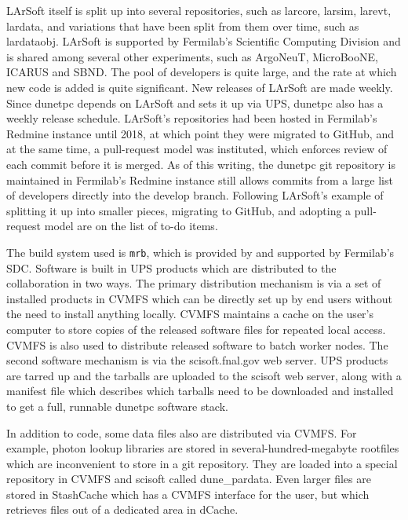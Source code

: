 LArSoft itself is split up into several repositories, such as larcore, larsim, larevt, lardata, and variations that have been split from them over time, such as lardataobj.  LArSoft is supported by Fermilab's Scientific Computing Division and is shared among several other experiments, such as ArgoNeuT, MicroBooNE, ICARUS and SBND.  The pool of developers is quite large, and the rate at which new code is added is quite significant.  New releases of LArSoft are made weekly.  Since dunetpc depends on LArSoft and sets it up via UPS, dunetpc also has a weekly release schedule.  LArSoft's repositories had been hosted in Fermilab's Redmine instance until 2018, at which point they were migrated to GitHub, and at the same time, a pull-request model was instituted, which enforces review of each commit before it is merged.  As of this writing, the dunetpc git repository is maintained in Fermilab's Redmine instance still allows commits from a large list of developers directly into the develop branch.  Following LArSoft's example of splitting it up into smaller pieces, migrating to GitHub, and adopting a pull-request model are on the list of to-do items.

The build system used is {\tt mrb}, which is provided by and supported by Fermilab's SDC.  Software is built in UPS products which are distributed to the collaboration in two ways.  The primary distribution mechanism is via a set of installed products in CVMFS which can be directly set up by end users without the need to install anything locally.  CVMFS maintains a cache on the user's computer to store copies of the released software files for repeated local access.  CVMFS is also used to distribute released software to batch worker nodes.  The second software mechanism is via the scisoft.fnal.gov web server.  UPS products are tarred up and the tarballs are uploaded to the scisoft web server, along with a manifest file which describes which tarballs need to be downloaded and installed to get a full, runnable dunetpc software stack.

In addition to code, some data files also are distributed via CVMFS.  For example, photon lookup libraries are stored in several-hundred-megabyte rootfiles which are inconvenient to store in a git repository.  They are loaded into a special repository in CVMFS and scisoft called dune\_pardata.  Even larger files are stored in StashCache which has a CVMFS interface for the user, but which retrieves files out of a dedicated area in dCache.

